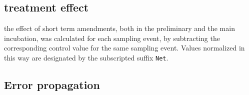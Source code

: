 \documentclass[12pt]{report}
\begin{document}
		
		
		
		\subsection{treatment effect}
		the effect of short term amendments, both in the preliminary and the main incubation, was calculated for each sampling event, by subtracting the corresponding control value for the same sampling event. Values normalized in this way are designated by the subscripted suffix \texttt{Net}.
		
		
		
		
		
		
		\vspace{2cm}
		
		
		\subsection{Error propagation}
		
\end{document}

